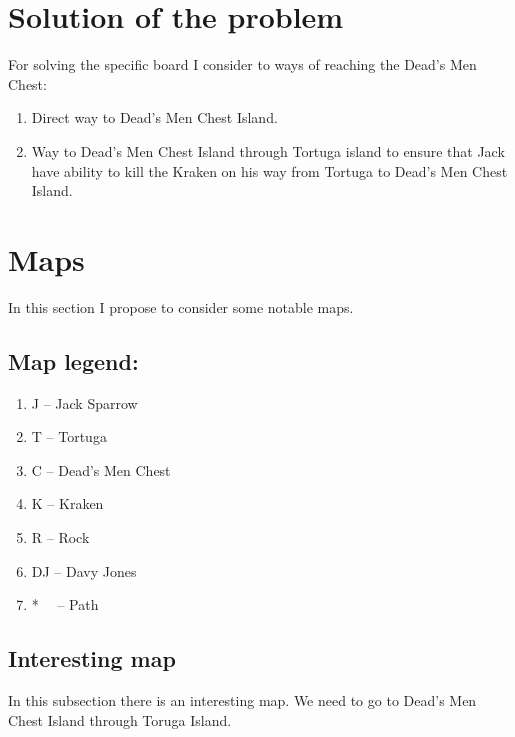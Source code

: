 \documentclass[a4paper]{article}
\begin{document}
\section{Solution of the problem}
For solving the specific board I consider to ways of reaching the Dead's Men Chest:
\begin{enumerate}
    \item Direct way to Dead's Men Chest Island.
    \item Way to Dead's Men Chest Island through Tortuga island to ensure that Jack have ability to kill the Kraken on his way from Tortuga to Dead's Men Chest Island.
\end{enumerate}

\section{Maps}
In this section I propose to consider some notable maps.
\subsection*{Map legend:}
\begin{enumerate}
    \item [] J -- Jack Sparrow
    \item [] T -- Tortuga
    \item [] C -- Dead's Men Chest
    \item [] K -- Kraken
    \item [] R -- Rock
    \item [] DJ -- Davy Jones
    \item [] * \ \  -- Path
\end{enumerate}
\subsection{Interesting map}
In this subsection there is an interesting map. We need to go to Dead's Men Chest Island through Toruga Island.
\begin{figure}[H]
    \centering
\end{figure}
\end{document}
